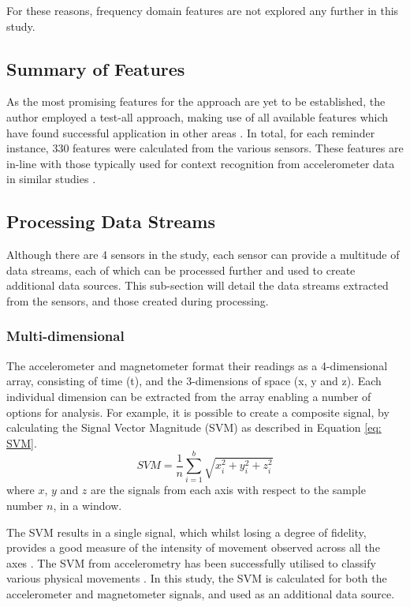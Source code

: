 For these reasons, frequency domain features are not explored any further in this study.

\subsection{Summary of Features}
As the most promising features for the approach are yet to be established, the author employed a test-all approach, making use of all available features which have found successful application in other areas \cite{Figo2010}. In total, for each reminder instance, 330 features were calculated from the various sensors. These features are in-line with those typically used for context recognition from accelerometer data in similar studies \cite{Figo2010}.

\subsection{Processing Data Streams}
Although there are 4 sensors in the study, each sensor can provide a multitude of data streams, each of which can be processed further and used to create additional data sources. This sub-section will detail the data streams extracted from the sensors, and those created during processing.

\subsubsection{Multi-dimensional}
The accelerometer and magnetometer format their readings as a 4-dimensional array, consisting of time (t), and the 3-dimensions of space (x, y and z). Each individual dimension can be extracted from the array enabling a number of options for analysis. For example, it is possible to create a composite signal, by calculating the Signal Vector Magnitude (SVM) as described in Equation \ref{eq: SVM}.
\begin{equation}
SVM =\frac{1}{n} \sum_{i=1}^b \sqrt{x_i^2 + y_i^2 + z_i^2 }
\label{eq: SVM}
\end{equation}
where $x$, $y$ and $z$ are the signals from each axis with respect to the sample number $n$, in a window.

The SVM results in a single signal, which whilst losing a degree of fidelity, provides a good measure of the intensity of movement observed across all the axes \cite{Karantonis2006}. The SVM from accelerometry has been successfully utilised to classify various physical movements \cite{Gu2011,Banos2012,Pande2013}. In this study, the SVM is calculated for both the accelerometer and magnetometer signals, and used as an additional data source.



